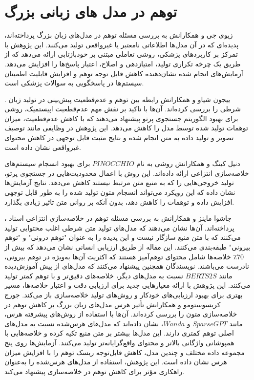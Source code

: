\section{توهم در مدل ‌های زبانی بزرگ}
 زیوی جی و همکارانش به بررسی مسئله توهم در مدل‌های زبان بزرگ پرداخته‌اند، پدیده‌ای که در آن مدل‌ها اطلاعاتی نامعتبر یا غیرواقعی تولید می‌کنند. این پژوهش با تمرکز بر کاربردهای پزشکی، روشی تعاملی مبتنی بر خودبازتابی ارائه می‌دهد که از طریق یک چرخه تکراری تولید، امتیازدهی و اصلاح، اعتبار پاسخ‌ها را افزایش می‌دهد. آزمایش‌های انجام شده نشان‌دهنده کاهش قابل توجه توهم و افزایش قابلیت اطمینان سیستم‌ها در پاسخگویی به سوالات پزشکی است\cite{ji-etal-2023-towards}​.

. ییجون شیاو و همکارانش رابطه بین توهم و عدم‌قطعیت پیش‌بینی در تولید زبان شرطی را بررسی کرده‌اند. آن‌ها با تاکید بر نقش مهم عدم‌قطعیت اپیستمیک، روشی برای بهبود الگوریتم جستجوی پرتو پیشنهاد می‌دهند که با کاهش عدم‌قطعیت، میزان توهمات تولید شده توسط مدل را کاهش می‌دهد. این پژوهش در وظایفی مانند توصیف تصویر و تولید داده به متن انجام شده و نتایج مثبت قابل توجهی در کاهش محتوای غیرواقعی نشان داده است\cite{xiao-wang-2021-hallucination}.

 دنیل کینگ و همکارانش روشی به نام $PINOCCHIO$ برای بهبود انسجام سیستم‌های خلاصه‌سازی انتزاعی ارائه داده‌اند. این روش با اعمال محدودیت‌هایی در جستجوی پرتو، تولید خروجی‌هایی را که به منبع متن مرتبط نیستند کاهش می‌دهد. نتایج آزمایش‌ها نشان داده که این رویکرد می‌تواند انسجام متون تولید شده را به طور قابل توجهی افزایش داده و توهمات را کاهش دهد، بدون آنکه بر روانی متن تاثیر زیادی بگذارد\cite{king-etal-2022-dont}​.

، جاشوا ماینز و همکارانش به بررسی مسئله توهم در خلاصه‌سازی انتزاعی اسناد پرداخته‌اند. آن‌ها نشان می‌دهند که مدل‌های تولید متن شرطی اغلب محتوایی تولید می‌کنند که با متن منبع سازگار نیست و این پدیده را به عنوان "توهم درونی" و "توهم بیرونی" طبقه‌بندی می‌کنند. این مقاله از طریق ارزیابی انسانی نشان می‌دهد که بیش از 70٪ خلاصه‌ها شامل محتوای توهم‌آمیز هستند که اکثریت آن‌ها به‌ویژه در توهم بیرونی، نادرست می‌باشند. نویسندگان همچنین پیشنهاد می‌کنند که مدل‌های از پیش آموزش‌دیده مانند $BERTS2S$ نسبت به مدل‌های دیگر، خلاصه‌های دقیق‌تر و با توهم کمتر تولید می‌کنند. این پژوهش با ارائه معیارهایی جدید برای ارزیابی دقت و اعتبار خلاصه‌ها، مسیر بهتری برای بهبود ارزیابی‌های خودکار و روش‌های تولید خلاصه‌سازی باز می‌کند​\cite{maynez-etal-2020-faithfulness}.
 جورج کریسوستومو و همکارانش تأثیر هرس مدل‌های زبان بزرگ بر کاهش توهم در خلاصه‌سازی متون را بررسی کرده‌اند. آن‌ها با استفاده از روش‌های پیشرفته هرس، مانند $SparseGPT$ و $Wanda$، نشان داده‌اند که مدل‌های هرس‌شده نسبت به مدل‌های اصلی توهم کمتری دارند. این مدل‌ها بیشتر بر متن منبع تکیه کرده و خلاصه‌هایی با همپوشانی واژگانی بالاتر و محتوای واقع‌گرایانه‌تر تولید می‌کنند. آزمایش‌ها روی پنج مجموعه داده مختلف و چندین مدل، کاهش قابل‌توجه ریسک توهم را با افزایش میزان هرس نشان داده است. این پژوهش، استفاده از مدل‌های هرس‌شده را به‌عنوان راهکاری مؤثر برای کاهش توهم در خلاصه‌سازی پیشنهاد می‌کند.
 
